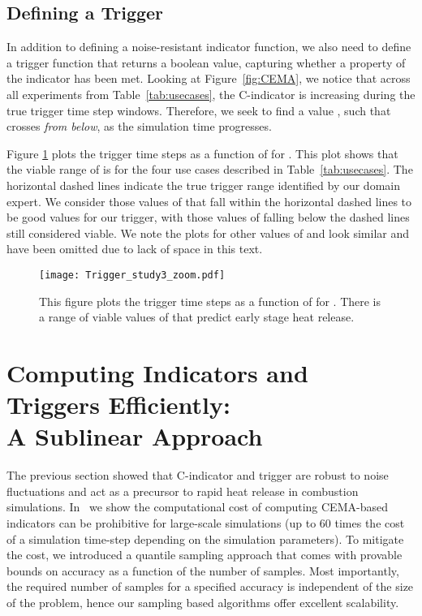 \documentclass{sig-alternate}
\newcommand{\cmetric}{C}
\begin{document}
\subsection{Defining a Trigger}
\label{sec:trigger} 

In addition to defining a noise-resistant indicator function, we also need to define a trigger
function that returns a boolean value, capturing whether a property of the
indicator has been met. Looking at Figure~\ref{fig:CEMA}, we notice that across all
experiments from Table~\ref{tab:usecases}, the \cmetric-indicator is increasing during
the true trigger time step windows.  Therefore, we seek to find a value 
, such that 
crosses  \emph{from
below}, as the simulation time  progresses. 

Figure \ref{fig:Triggers_thresh} plots the trigger time steps as a function of
 for . 
This plot shows that the viable range of  is 
for the four use cases described in Table~\ref{tab:usecases}.  
The horizontal dashed lines indicate the true trigger range identified by our
domain expert.  We consider those values of  that fall
within the horizontal dashed lines to be good  values for our
trigger, with those values of  falling below the dashed
lines still considered viable.  
 We note the plots for other values of
 and  look similar and have been omitted due to lack of space in
this text. 

\begin{figure}[t]
\centering
\texttt{[image: Trigger\_study3\_zoom.pdf]}
\caption{\label{fig:Triggers_thresh} This figure plots the trigger time steps as a function of
 for .
There is a range of viable values of 
that predict early stage heat release.
}
\end{figure}

\section{Computing Indicators and \\Triggers Efficiently: \\A Sublinear Approach}
\label{sec:sample} 
The previous section showed that \cmetric-indicator and
trigger are robust to noise fluctuations and act as a precursor to rapid heat
release in combustion simulations. In~\cite{cema-insitu} we show 
the computational cost of computing CEMA-based indicators can be prohibitive for large-scale
simulations (up to 60 times the cost of a simulation time-step depending on the
simulation parameters).  
To mitigate the cost, we introduced a quantile sampling approach that comes with
provable bounds on accuracy as a function of the number of samples.  Most
importantly,  the required number of samples for a specified accuracy is
independent of  the size of the problem, hence our sampling based algorithms
offer  excellent scalability. 
\end{document}
